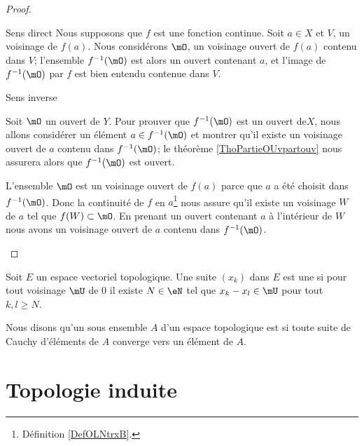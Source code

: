 \begin{proof}
    \begin{subproof}
    \item[Sens direct]
        Nous supposons que \( f\) est une fonction continue. Soit \( a\in X\) et \( V\), un voisinage de \( f(a)\). Nous considérons \( \mO\), un voisinage ouvert de \( f(a)\) contenu dans \( V\); l'ensemble \( f^{-1}(\mO)\) est alors un ouvert contenant \( a\), et l'image de \( f^{-1}(\mO)\) par \( f\) est bien entendu contenue dans \( V\).

    \item[Sens inverse]

        Soit \( \mO\) un ouvert de \( Y\). Pour prouver que \( f^{-1}(\mO)\) est un ouvert de\( X\), nous allons considérer un élément \( a\in f^{-1}(\mO)\) et montrer qu'il existe un voisinage ouvert de \( a\) contenu dans \( f^{-1}(\mO)\); le théorème \ref{ThoPartieOUvpartouv} nous assurera alors que \( f^{-1}(\mO)\) est ouvert.

        L'ensemble \( \mO\) est un voisinage ouvert de \( f(a)\) parce que \( a\) a été choisit dans \( f^{-1}(\mO)\). Donc la continuité de \( f\) en \( a\)\footnote{Définition \ref{DefOLNtrxB}.} nous assure qu'il existe un voisinage \( W\) de \( a\) tel que \( f(W)\subset\mO\). En prenant un ouvert contenant \( a\) à l'intérieur de \( W\) nous avons un voisinage ouvert de \( a\) contenu dans \( f^{-1}(\mO)\).
    \end{subproof}
\end{proof}

\begin{definition}   \label{DefZSnlbPc}
    Soit \( E\) un espace vectoriel topologique. Une suite \( (x_k)\) dans \( E\) est une  si pour tout voisinage \( \mU\) de \( 0\) il existe \( N\in \eN\) tel que \( x_k-x_l\in\mU\) pour tout \( k,l\geq N\).
\end{definition}

\begin{definition}
    Nous disons qu'un sous ensemble \( A\) d'un espace topologique est  si toute suite de Cauchy d'éléments de \( A\) converge vers un élément de \( A\).
\end{definition}

\section{Topologie induite}

